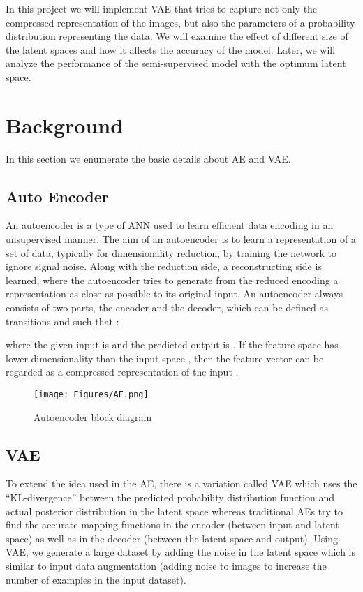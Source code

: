 \documentclass[sigconf, authorversion]{acmart}
\begin{document}
In this project we  will implement VAE  that tries to capture not only the compressed representation of the images, but also the parameters of a probability distribution representing the data. We will examine the effect of different size of the latent spaces and how it affects the accuracy of the model. Later, we will analyze the performance of the semi-supervised model with the optimum latent space.

\section{Background}
In this section we enumerate the basic details about AE and VAE.  
\subsection{Auto Encoder}
An autoencoder is a type of ANN used to learn efficient data encoding in an unsupervised manner. The aim of an autoencoder is to learn a representation of a set of data, typically for dimensionality reduction, by training the network to ignore signal noise. Along with the reduction side, a reconstructing side is learned, where the autoencoder tries to generate from the reduced encoding a representation as close as possible to its original input. 
An autoencoder always consists of two parts, the encoder and the decoder, which can be defined as transitions  and  such that \cite{wikiautoencode}:



where the given input is  and the predicted output is . If the feature space  has lower dimensionality than the input space , then the feature vector  can be regarded as a compressed representation of the input .
\begin{figure}[h!]
    \centering
    \texttt{[image: Figures/AE.png]}
    \caption{Autoencoder block diagram} \label{fig:1}
\end{figure} 

\subsection{VAE}
To extend the idea used in the AE, there is a variation called VAE which uses the ``KL-divergence'' between the predicted probability distribution function and actual posterior distribution in the latent space whereas traditional AEs try to find the accurate mapping functions in the encoder (between input and latent space) as well as in the decoder (between the latent space and output). Using VAE, we generate a large dataset by adding the noise in the latent space which is similar to input data augmentation (adding noise to images to increase the number of examples in the input dataset). 
\end{document}
